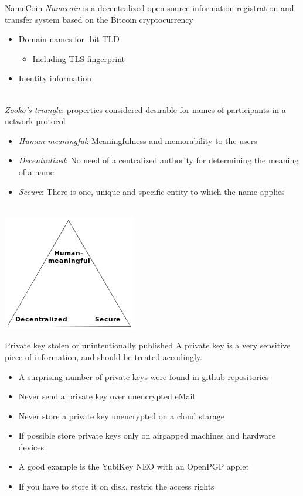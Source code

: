 \documentclass[11pt]{beamer}
\begin{document}
\begin{frame}{NameCoin}
\emph{Namecoin} is a decentralized open source information registration and transfer system based on the Bitcoin cryptocurrency
\begin{itemize}
\item Domain names for .bit TLD
\begin{itemize}
\item Including TLS fingerprint
\end{itemize}
\item Identity information 
\end{itemize}
\\[0.2cm]
\pause
\emph{Zooko's triangle}: properties considered desirable for names of participants in a network protocol
\begin{itemize}
\item \emph{Human-meaningful}: Meaningfulness and memorability to the users
\item \emph{Decentralized}: No need of a centralized authority for determining the meaning of a name
\item \emph{Secure}: There is one, unique and specific entity to which the name applies
\end{itemize}
\\[0.2cm]
\includegraphics[scale=0.2]{zooko_triangle.png}
\end{frame}

\begin{frame}{Private key stolen or unintentionally published}
A private key is a very sensitive piece of information, and should be treated accodingly.
\\[0.2cm]
\begin{itemize}
\item A surprising number of private keys were found in github repositories
\item Never send a private key over unencrypted eMail %
\item Never store a private key unencrypted on a cloud starage
\item If possible store private keys only on airgapped machines and hardware devices
\item A good example is the YubiKey NEO with an OpenPGP applet
\item If you have to store it on disk, restric the access rights
\end{itemize}
\end{frame}
\end{document}
